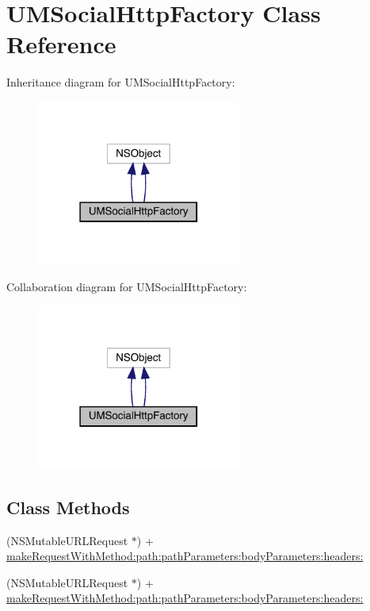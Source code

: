 \hypertarget{interface_u_m_social_http_factory}{}\section{U\+M\+Social\+Http\+Factory Class Reference}
\label{interface_u_m_social_http_factory}


Inheritance diagram for U\+M\+Social\+Http\+Factory\+:\nopagebreak
\begin{figure}[H]
\begin{center}
\leavevmode
\includegraphics[width=190pt]{interface_u_m_social_http_factory__inherit__graph}
\end{center}
\end{figure}


Collaboration diagram for U\+M\+Social\+Http\+Factory\+:\nopagebreak
\begin{figure}[H]
\begin{center}
\leavevmode
\includegraphics[width=190pt]{interface_u_m_social_http_factory__coll__graph}
\end{center}
\end{figure}
\subsection*{Class Methods}
\begin{DoxyCompactItemize}
\item 
(N\+S\+Mutable\+U\+R\+L\+Request $\ast$) + \mbox{\hyperlink{interface_u_m_social_http_factory_a8424dae8943b41540d506e98b26a8fd7}{make\+Request\+With\+Method\+:path\+:path\+Parameters\+:body\+Parameters\+:headers\+:}}
\item 
(N\+S\+Mutable\+U\+R\+L\+Request $\ast$) + \mbox{\hyperlink{interface_u_m_social_http_factory_a8424dae8943b41540d506e98b26a8fd7}{make\+Request\+With\+Method\+:path\+:path\+Parameters\+:body\+Parameters\+:headers\+:}}
\end{DoxyCompactItemize}


